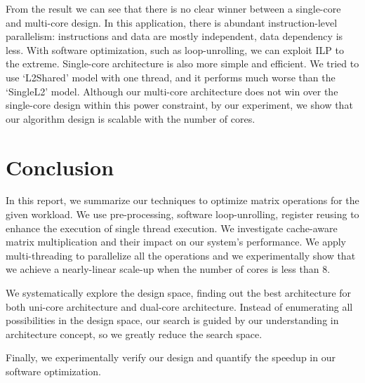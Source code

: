 \documentclass[twocolumn,letterpaper,10pt]{article}
\begin{document}
From the result we can see that there is no clear winner between a
single-core and multi-core design. In this application, there is
abundant instruction-level parallelism: instructions and data are
mostly independent, data dependency is less. With software
optimization, such as loop-unrolling, we can exploit ILP to the
extreme. Single-core architecture is also more simple and
efficient. We tried to use `L2Shared' model with one thread, and it performs
much worse than the `SingleL2' model. Although our multi-core architecture does not win over the single-core
design within this power constraint, by our experiment, we show that
our algorithm design is scalable with the number of cores.

\section{Conclusion}
\label{sec:conclude}

In this report, we summarize our techniques to optimize matrix
operations for the given workload. We use pre-processing, software loop-unrolling,
register reusing to enhance the execution of single thread
execution. We investigate cache-aware matrix multiplication and their
impact on our system's performance. We apply multi-threading to
parallelize all the operations and we experimentally show that we
achieve a nearly-linear scale-up when the number of cores is less than 8.

We systematically explore the design space, finding out the best
architecture for both uni-core architecture and dual-core
architecture. Instead of enumerating all possibilities in the design
space, our search is guided by our understanding in architecture
concept, so we greatly reduce the search space.

Finally, we experimentally verify our design and quantify the speedup
in our software optimization.



\end{document}
